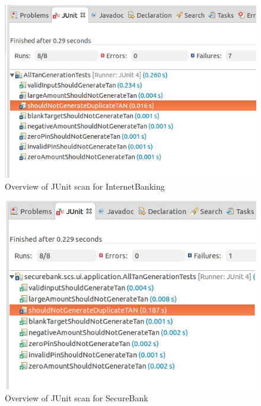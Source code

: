 \begin{figure}[ht]
	\centering
	\includegraphics[width=.8\linewidth]{figures/junit_overview.png}
	\caption{Overview of JUnit scan for InternetBanking}
	\label{fig:junit_overview}
\end{figure}

\begin{figure}[ht]
	\centering
	\includegraphics[width=.8\linewidth]{figures/junit_overview_secure_bank.png}
	\caption{Overview of JUnit scan for SecureBank}
	\label{fig:junit_overview_secure_bank}
\end{figure}